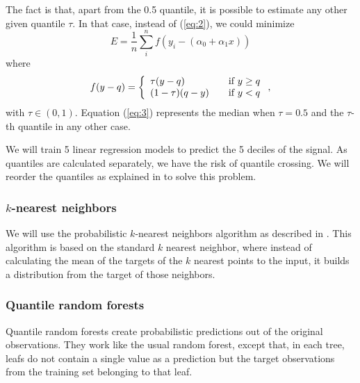 \documentclass[a4paper,twocolumn,5p]{elsarticle}
\begin{document}
The fact is that, apart from the 0.5 quantile, it is possible to
estimate any other given quantile $\tau$. In that case, instead of
(\ref{eq:2}), we could minimize
\begin{equation}
  \label{eq:3}
  E= \frac{1}{n} \sum^n_i f( y_i - (\alpha_0 + \alpha_1 x))
\end{equation}
where
\begin{equation}
  \label{eq:4}
  f(y-q) = \left\{ 
    \begin{array}{l l}
      \tau (y-q) & \quad \mbox{if $y \ge q$}\\
      (1-\tau) (q-y) & \quad \mbox{if $y < q$}\\
    \end{array} \right.,
\end{equation}
with $\tau \in (0,1)$. Equation (\ref{eq:3}) represents the median
when $\tau=0.5$ and the $\tau$-th quantile in any other case.

We will train 5 linear regression models to predict the 5 deciles of
the signal. As quantiles are calculated separately, we have the risk
of quantile crossing.  We will reorder the quantiles as explained in
\cite{cross} to solve this problem.

\subsubsection{$k$-nearest neighbors}

We will use the probabilistic $k$-nearest neighbors algorithm as
described in \cite{quantileknnmangalova}.  This algorithm is based on
the standard $k$ nearest neighbor, where instead of calculating the
mean of the targets of the $k$ nearest points to the input, it builds
a distribution from the target of those neighbors.

\subsubsection{Quantile random forests}


Quantile random forests create probabilistic predictions out of the
original observations. They work like the usual random forest, except
that, in each tree, leafs do not contain a single value as a
prediction but the target observations from the training set belonging
to that
leaf.%
\end{document}
